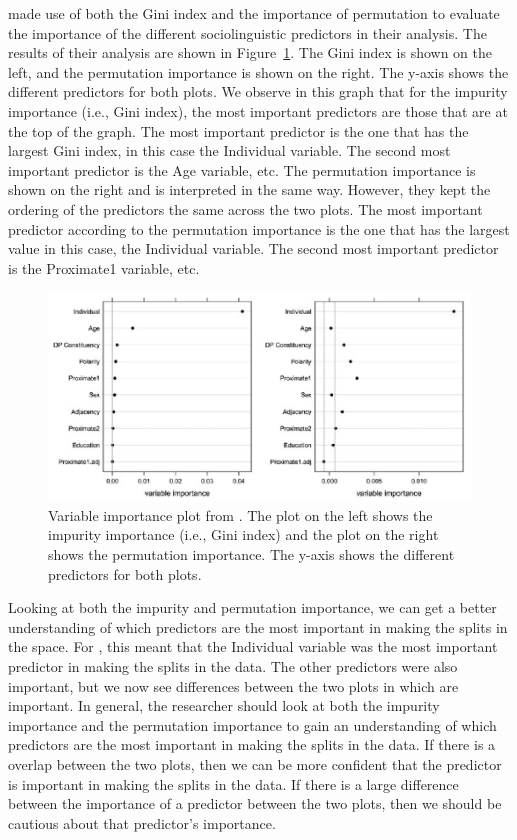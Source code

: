 \citet{tagliamonteModelsForestsTrees2012} made use of both the Gini index and the importance of permutation to evaluate the importance of the different sociolinguistic predictors in their analysis. The results of their analysis are shown in Figure~\ref{fig:tagliamonte_importance}. The Gini index is shown on the left, and the permutation importance is shown on the right. The y-axis shows the different predictors for both plots. We observe in this graph that for the impurity importance (i.e., Gini index), the most important predictors are those that are at the top of the graph. The most important predictor is the one that has the largest Gini index, in this case the Individual variable. The second most important predictor is the Age variable, etc. The permutation importance is shown on the right and is interpreted in the same way. However, they kept the ordering of the predictors the same across the two plots. The most important predictor according to the permutation importance is the one that has the largest value in this case, the Individual variable. The second most important predictor is the Proximate1 variable, etc.

\begin{figure}[h!]
    \centering
    \includegraphics[width = 0.9\linewidth]{images/TagliamonteBaayen_vip.png}
    \caption{Variable importance plot from \citet{tagliamonteModelsForestsTrees2012}. The plot on the left shows the impurity importance (i.e., Gini index) and the plot on the right shows the permutation importance. The y-axis shows the different predictors for both plots.}
    \label{fig:tagliamonte_importance}
\end{figure}

Looking at both the impurity and permutation importance, we can get a better understanding of which predictors are the most important in making the splits in the space. For \citet{tagliamonteModelsForestsTrees2012}, this meant that the Individual variable was the most important predictor in making the splits in the data. The other predictors were also important, but we now see differences between the two plots in which are important. In general, the researcher should look at both the impurity importance and the permutation importance to gain an understanding of which predictors are the most important in making the splits in the data. If there is a overlap between the two plots, then we can be more confident that the predictor is important in making the splits in the data. If there is a large difference between the importance of a predictor between the two plots, then we should be cautious about that predictor's importance. 

